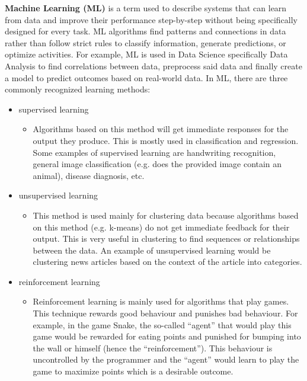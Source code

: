 \textbf{Machine Learning (ML)} is a term used to describe systems that can learn from data and improve their performance step-by-step without being specifically designed for every task. ML algorithms find patterns and connections in data rather than follow strict rules to classify information, generate predictions, or optimize activities. For example, ML is used in Data Science specifically Data Analysis to find correlations between data, preprocess said data and finally create a model to predict outcomes based on real-world data. In ML, there are three commonly recognized learning methods:
\begin{itemize}
    \item supervised learning
        \begin{itemize}
            \item Algorithms based on this method will get immediate responses for the output they produce. This is mostly used in classification and regression. Some examples of supervised learning are handwriting recognition, general image classification (e.g. does the provided image contain an animal), disease diagnosis, etc.
        \end{itemize}
    \item unsupervised learning
        \begin{itemize}
                \item This method is used mainly for clustering data because algorithms based on this method (e.g. k-means) do not get immediate feedback for their output. This is very useful in clustering to find sequences or relationships between the data. An example of unsupervised learning would be clustering news articles based on the context of the article into categories.
            \end{itemize}
    \item reinforcement learning
        \begin{itemize}
            \item Reinforcement learning is mainly used for algorithms that play games. This technique rewards good behaviour and punishes bad behaviour. For example, in the game Snake, the so-called ``agent'' that would play this game would be rewarded for eating points and punished for bumping into the wall or himself (hence the ``reinforcement''). This behaviour is uncontrolled by the programmer and the ``agent'' would learn to play the game to maximize points which is a desirable outcome.
        \end{itemize}
\end{itemize}

